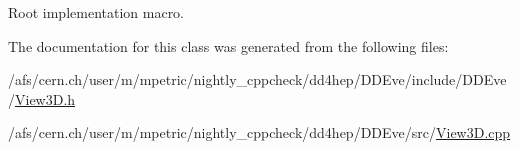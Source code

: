 Root implementation macro. 



The documentation for this class was generated from the following files\+:\begin{DoxyCompactItemize}
\item 
/afs/cern.\+ch/user/m/mpetric/nightly\+\_\+cppcheck/dd4hep/\+D\+D\+Eve/include/\+D\+D\+Eve/\hyperlink{_view3_d_8h}{View3\+D.\+h}\item 
/afs/cern.\+ch/user/m/mpetric/nightly\+\_\+cppcheck/dd4hep/\+D\+D\+Eve/src/\hyperlink{_view3_d_8cpp}{View3\+D.\+cpp}\end{DoxyCompactItemize}
